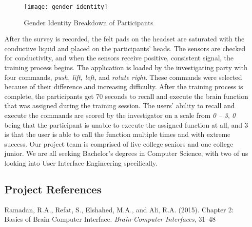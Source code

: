 \documentclass{article}
\begin{document}
\begin{figure}[h]
\centering
\texttt{[image: gender\_identity]}
\caption{Gender Identity Breakdown of Participants}
\end{figure}

After the survey is recorded, the felt pads on the headset are saturated with the conductive liquid and placed on the participants' heads. The sensors are checked for conductivity, and when the sensors receive positive, consistent signal, the training process begins. 
\newline \newline
The application is loaded by the investigating party with four commands, \textit{push, lift, left,} and \textit{rotate right}. These commands were selected because of their difference and increasing difficulty. After the training process is complete, the participants get 70 seconds to recall and execute the brain function that was assigned during the training session. 
\newline \newline
The users' ability to recall and execute the commands are scored by the investigator on a scale from \textit{0 -- 3}, \textit{0} being that the participant is unable to execute the assigned function at all, and 3 is that the user is able to call the function multiple times and with extreme success.  
\newline\newline 
Our project team is comprised of five college seniors and one college junior. We are all seeking Bachelor's degrees in Computer Science, with two of us looking into User Interface Engineering specifically.

\subsection*{Project References}
Ramadan, R.A., Refat, S., Elshahed, M.A., and Ali, R.A. (2015). Chapter 2: Basics of Brain Computer Interface. \textit{Brain-Computer Interfaces}, 31--48
\end{document}
